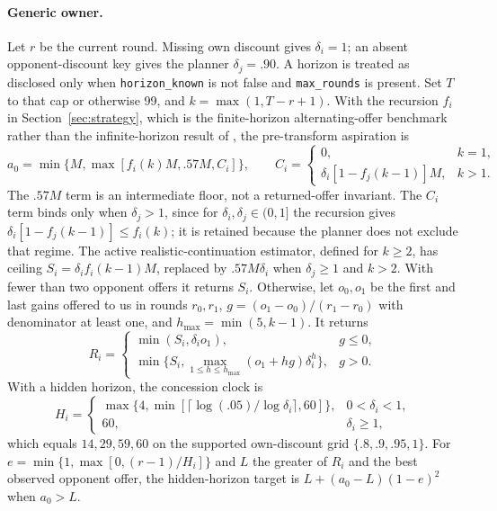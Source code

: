 \paragraph{Generic owner.}
Let $r$ be the current round. Missing own discount gives $\delta_i=1$; an
absent opponent-discount key gives the planner $\delta_j=.90$. A horizon is
treated as disclosed only when \texttt{horizon\_known} is not false and
\texttt{max\_rounds} is present. Set $T$ to that cap or otherwise 99, and
$k=\max(1,T-r+1)$. With the recursion $f_i$ in Section~\ref{sec:strategy}, which is the
finite-horizon alternating-offer benchmark rather than the infinite-horizon
result of \citet{rubinstein1982}, the pre-transform aspiration is
\begin{equation}
a_0=\min\{M,\max[f_i(k)M,.57M,C_i]\},\qquad
C_i=\begin{cases}0,&k=1,\\
\delta_i[1-f_j(k-1)]M,&k>1.
\end{cases}
\label{eq:banked-barg-aspiration}
\end{equation}
The $.57M$ term is an intermediate floor, not a returned-offer invariant. The
$C_i$ term binds only when $\delta_j>1$, since for $\delta_i,\delta_j\in(0,1]$
the recursion gives $\delta_i[1-f_j(k-1)]\leq f_i(k)$; it is retained because
the planner does not exclude that regime. The
active realistic-continuation estimator, defined for $k\geq2$, has ceiling
$S_i=\delta_i f_i(k-1)M$, replaced by $.57M\delta_i$ when
$\delta_j\geq1$ and $k>2$. With fewer than two opponent offers it returns
$S_i$. Otherwise, let $o_0,o_1$ be the first and last gains offered to us in rounds $r_0,r_1$,
$g=(o_1-o_0)/(r_1-r_0)$ with denominator at least one, and
$h_{\max}=\min(5,k-1)$. It returns
\begin{equation}
R_i=\begin{cases}
\min(S_i,\delta_i o_1),&g\leq0,\\
\min\{S_i,\max_{1\leq h\leq h_{\max}}(o_1+hg)\delta_i^h\},&g>0.
\end{cases}
\label{eq:banked-barg-realistic}
\end{equation}
With a hidden horizon, the concession clock is
\begin{equation}
H_i=\begin{cases}
\max\{4,\min[\lceil\log(.05)/\log\delta_i\rceil,60]\},&0<\delta_i<1,\\
60,&\delta_i\geq1,
\end{cases}
\label{eq:banked-barg-clock}
\end{equation}
which equals $14,29,59,60$ on the supported own-discount grid $\{.8,.9,.95,1\}$. For
$e=\min\{1,\max[0,(r-1)/H_i]\}$ and $L$ the greater of $R_i$ and the best
observed opponent offer, the hidden-horizon target is
$L+(a_0-L)(1-e)^2$ when $a_0>L$.

